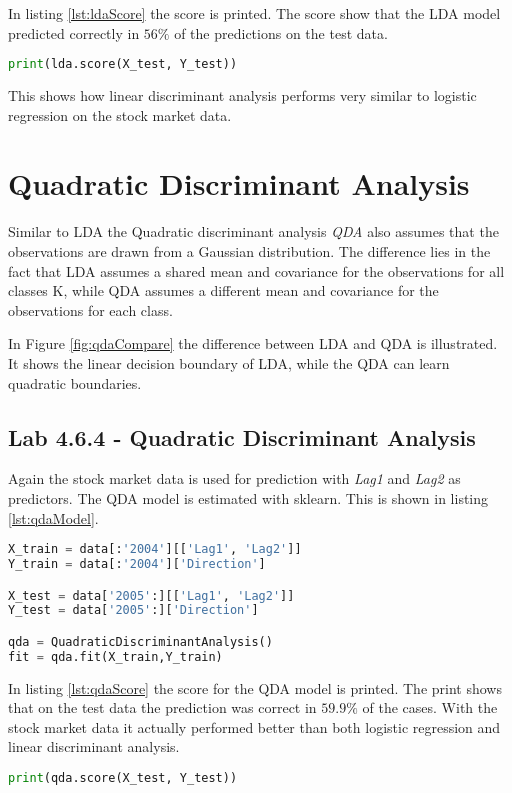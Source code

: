 In listing \ref{lst:ldaScore} the score is printed. The score show that the LDA model predicted correctly in $56\%$ of the predictions on the test data. 
\begin{lstlisting}[language=Python, label=lst:ldaScore, caption=Printing LDA score]
print(lda.score(X_test, Y_test))
\end{lstlisting}

This shows how linear discriminant analysis performs very similar to logistic regression on the stock market data.

\section{Quadratic Discriminant Analysis}
Similar to LDA the Quadratic discriminant analysis \emph{QDA} also assumes that the observations are drawn from a Gaussian distribution. The difference lies in the fact that LDA assumes a shared mean and covariance for the observations for all classes K, while QDA assumes a different mean and covariance for the observations for each class.


In Figure \ref{fig:qdaCompare} the difference between LDA and QDA is illustrated. It shows the linear decision boundary of LDA, while the QDA can learn quadratic boundaries.

\subsection{Lab 4.6.4 - Quadratic Discriminant Analysis}
Again the stock market data is used for prediction with \emph{Lag1} and \emph{Lag2} as predictors. The QDA model is estimated with sklearn. This is shown in listing \ref{lst:qdaModel}.

\begin{lstlisting}[language=Python, label=lst:qdaModel, caption=Creating QDA model]
X_train = data[:'2004'][['Lag1', 'Lag2']]
Y_train = data[:'2004']['Direction']

X_test = data['2005':][['Lag1', 'Lag2']]
Y_test = data['2005':]['Direction']

qda = QuadraticDiscriminantAnalysis()
fit = qda.fit(X_train,Y_train)
\end{lstlisting}

In listing \ref{lst:qdaScore} the score for the QDA model is printed. The print shows that on the test data the prediction was correct in $59.9\%$ of the cases. With the stock market data it actually performed better than both logistic regression and linear discriminant analysis. 
\begin{lstlisting}[language=Python, label=lst:qdaScore, caption=Printing qda score]
print(qda.score(X_test, Y_test))
\end{lstlisting}

